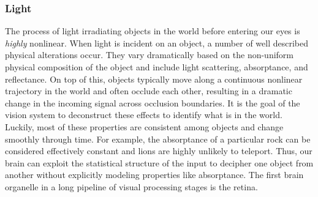 \subsubsection{Light} The process of light irradiating objects in the world before entering our eyes is \textit{highly} nonlinear. When light is incident on an object, a number of well described physical alterations occur. They vary dramatically based on the non-uniform physical composition of the object and include light scattering, absorptance, and reflectance. On top of this, objects typically move along a continuous nonlinear trajectory in the world and often occlude each other, resulting in a dramatic change in the incoming signal across occlusion boundaries. It is the goal of the vision system to deconstruct these effects to identify what is in the world. Luckily, most of these properties are consistent among objects and change smoothly through time. For example, the absorptance of a particular rock can be considered effectively constant and lions are highly unlikely to teleport. Thus, our brain can exploit the statistical structure of the input to decipher one object from another without explicitly modeling properties like absorptance. The first brain organelle in a long pipeline of visual processing stages is the retina.


